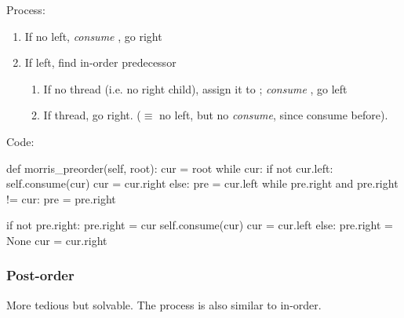 Process:
\begin{enumerate}
\item If no left, \textit{consume} , go right 
\item If left, find in-order predecessor 
\begin{enumerate}
\item If no thread (i.e. no  right child), assign it to ; \textit{consume} , go left
\item If thread, go right. ($\equiv$ no left, but no \textit{consume}, since consume before). 
\end{enumerate}
\end{enumerate}
Code:
\begin{python}
def morris_preorder(self, root):
    cur = root
    while cur:
        if not cur.left:
            self.consume(cur)
            cur = cur.right
        else:
            pre = cur.left
            while pre.right and pre.right != cur:
                pre = pre.right

            if not pre.right:
                pre.right = cur
                self.consume(cur)
                cur = cur.left
            else:
                pre.right = None
                cur = cur.right
\end{python}
\subsubsection{Post-order}
More tedious but solvable. The process is also similar to in-order.

